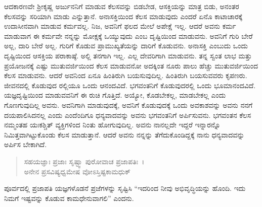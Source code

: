 ಆದಕಾರಣವೇ ಶ‍್ರೀಕೃಷ್ಣ ಅರ್ಜುನನಿಗೆ ಮಾಡುವ ಕೆಲಸವನ್ನು ಬಿಡಬೇಡ, ಆಸಕ್ತಿಯನ್ನು ಮಾತ್ರ ಬಿಡು, ಅನಂತರ ಕೆಲಸವನ್ನು ಸರಿಯಾಗಿ ಮಾಡು ಎನ್ನುತ್ತಾನೆ. ಅನಾಸಕ್ತಿಯಿಂದ ಕೆಲಸ ಮಾಡುವುದು ಎಂದರೆ ಏನೊ ಕಾಟಾಚಾರಕ್ಕೆ ಉದಾಸೀನವಾಗಿ ಮಾಡುವ ಕರ್ಮವಲ್ಲ. ನಿಜ, ಅವನಿಗೆ ಫಲದ ಮೇಲೆ ಅಪೇಕ್ಷೆ ಇಲ್ಲ. ಆದರೆ ಅವನು ಕರ್ಮ ಮಾಡುವಾಗ ಈ ಕರ್ಮವೇ ನನ್ನನ್ನು ಮೋಕ್ಷಕ್ಕೆ ಒಯ್ಯುವುದು ಎಂಬ ದೃಷ್ಟಿಯಿಂದ ಮಾಡುವನು. ಅವನಿಗೆ ಗುರಿ ಬೇರೆ ಅಲ್ಲ, ದಾರಿ ಬೇರೆ ಅಲ್ಲ. ಗುರಿಗೆ ಕೊಡುವ ಪ್ರಾಮುಖ್ಯತೆಯನ್ನು ದಾರಿಗೆ ಕೊಡುವನು. ಅನಾಸಕ್ತಿ ಎಂಬುದು ಒಂದು ದೃಷ್ಟಿಯಿಂದ ಆಸಕ್ತಿಯ ಪರಾಕಾಷ್ಠೆ. ಅಲ್ಲಿ ತನಗಾಗಿ ಇಲ್ಲ. ಎಲ್ಲ ದೇವರಿಗಾಗಿ ಮಾಡುವನು. ತನ್ನ ಸ್ವಂತ ಲಾಭ ಮತ್ತು ಪ್ರಯೋಜನಕ್ಕೆ ಎಷ್ಟು ಮುತುವರ್ಜಿಯಿಂದ ಕೆಲಸ ಮಾಡುವನೋ ಅದಕ್ಕಿಂತ ನೂರು ಪಾಲು ಹೆಚ್ಚು ಮುತುವರ್ಜಿಯಿಂದ ಕೆಲಸ ಮಾಡುವನು. ಆದರೆ ಅವನಿಂದ ಏನೂ ಹಿಂತಿರುಗಿ ಬಯಸುವುದಿಲ್ಲ. ಹಿಂತಿರುಗಿ ಬಯಸುವವರು ಕೃಪಣರು. ಜೀವನದಲ್ಲಿ ಕೊಡುವುದ ರಲ್ಲಿಯೂ ಒಂದು ಆನಂದವಿದೆ. ಭಗವಂತನಿಗೆ ಕೊಡುವುದರಲ್ಲಿ ಒಂದು ಭೂಮಾನಂದವಿದೆ. ಯಜ್ಞದೃಷ್ಟಿಯಿಂದ ಮಾಡುವವನಿಗೆ ಈ ರುಚಿ ಗೊತ್ತಿದೆ. ಅಯ್ಯೋ, ಕೊಡಬೇಕಲ್ಲ, ಮಾಡಬೇಕಲ್ಲ ಎಂದು ಗೊಣಗುವುದಿಲ್ಲ ಅವನು. ಅವನಿಗಾಗಿ ಮಾಡುವುದಕ್ಕೆ, ಅವನಿಗೆ ಕೊಡುವುದಕ್ಕೆ ಒಂದು ಅವಕಾಶವನ್ನು ಅವನು ನನಗೆ ದಯಪಾಲಿಸಿದನಲ್ಲ ಎಂದು ಎಂದೆಂದಿಗೂ ಧನ್ಯವಾದವನ್ನು ಅವನು ಭಗವಂತನಿಗೆ ಅರ್ಪಿಸುವನು. ಭಗವಂತನ ಕೆಲಸ ನಮ್ಮಂತಹ ಯಃಕಶ್ಚಿತ್ ವ್ಯಕ್ತಿಗಳಿಂದ ನಿಂತು ಹೋಗುವುದಿಲ್ಲ. ಅವನು ನಾನಲ್ಲದೇ ಇದ್ದರೆ ಇನ್ನಾರನ್ನೊ ನಿಮಿತ್ತವಾಗಿಟ್ಟುಕೊಂಡು ಕೆಲಸ ಮಾಡುತ್ತಾನೆ. ಆದರೆ ಅವನು ನನ್ನನ್ನು ತೆಗೆದುಕೊಂಡಿದ್ದಕ್ಕೆ ನಾನು ಧನ್ಯವಾದವನ್ನು ಅರ್ಪಿಸ ಬೇಕಾಗಿದೆ.

\begin{verse}
ಸಹಯಜ್ಞಾಃ ಪ್ರಜಾಃ ಸೃಷ್ಟ್ವಾ ಪುರೋವಾಚ ಪ್ರಜಾಪತಿಃ~।\\ಅನೇನ ಪ್ರಸವಿಷ್ಯಧ್ವಮೇಷ ವೋಽಸ್ತಿಷ್ಟಕಾಮಧುಕ್ 
\end{verse}

{\small ಪೂರ್ವದಲ್ಲಿ ಪ್ರಜಾಪತಿ ಯಜ್ಞಗಳೊಡನೆ ಪ್ರಜೆಗಳನ್ನು ಸೃಷ್ಟಿಸಿ “ಇದರಿಂದ ನೀವು ಅಭಿವೃದ್ಧಿಯನ್ನು ಹೊಂದಿ. ಇದು ನಿಮಗೆ ಇಷ್ಟವನ್ನು ಕೊಡುವ ಕಾಮಧೇನುವಾಗಲಿ” ಎಂದನು.}

